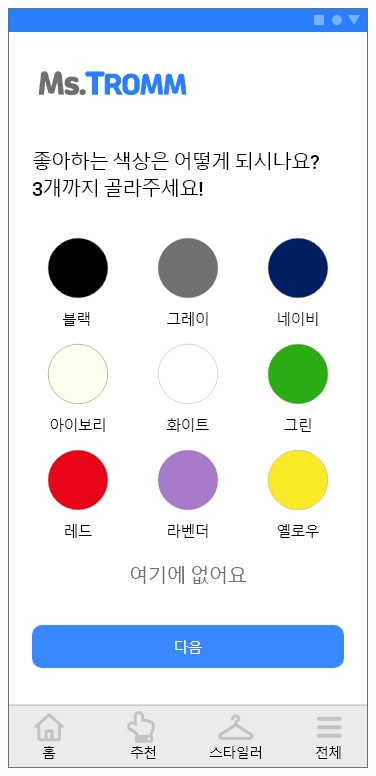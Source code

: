 \documentclass[conference]{IEEEtran}
\begin{document}
\begin{enumerate}
\begin{enumerate}
{                   \includegraphics[scale=0.15]{assets/설문지4.jpg}
}
\end{enumerate}
\end{enumerate}
\end{document}
